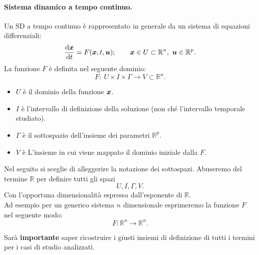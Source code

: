 \paragraph{Sistema dinamico a tempo continuo.}%
\label{par:Sistema dinamico a tempo continuo.}
Un SD a tempo continuo è rappresentato in generale da un sistema di equazioni differenziali:
\[
    \frac{\text{d} \boldsymbol{x}}{\text{d} t} = F(\boldsymbol{x}, t, \boldsymbol{u});
    \qquad 
    \boldsymbol{x}\in U \subset \mathbb{R}^n, \ \boldsymbol{u}  \in \mathbb{R}^p
.\] 
La funzione $F$ è definita nel seguente dominio:
\[
    F: \ U \times I \times \Gamma  \to V \subset \mathbb{R}^n
.\] 
\begin{itemize}
    \item $U$ è il dominio della funzione $\boldsymbol{x}$.
    \item $I$ è l'intervallo di definizione della soluzione (non ché l'intervallo temporale studiato).
    \item $\Gamma$ è il sottospazio dell'insieme dei parametri $\mathbb{R}^p$.
    \item $V$ è L'insieme in cui viene mappato il dominio iniziale dalla $F$.
\end{itemize}
\begin{defn}
    Nel seguito si sceglie di alleggerire la notazione dei sottospazi. Abuseremo del termine $\mathbb{R}$ per definire tutti gli spazi
    \[
        U, I, \Gamma, V
    .\] 
    Con l'opportuna dimensionalità espressa dall'esponente di $\mathbb{R}$. \\
    Ad esempio per un generico sistema $n$ dimensionale esprimeremo la funzione $F$ nel seguente modo:
    \[
        F:\mathbb{R}^n\to \mathbb{R}^n
    .\] 
\end{defn}
\noindent
Sarà \textbf{importante} saper ricostruire i giusti insiemi di definizione di tutti i termini per i casi di studio analizzati.
